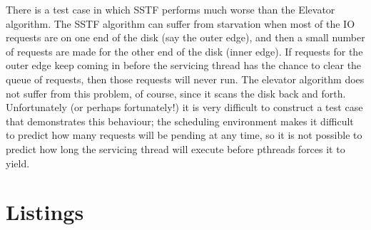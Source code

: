 \documentclass{report}
\begin{document}
There is a test case in which SSTF performs much worse than the Elevator algorithm. The
SSTF algorithm can suffer from starvation when most of the IO requests are on one end of
the disk (say the outer edge), and then a small number of requests are made for the other
end of the disk (inner edge). If
requests for the outer edge keep coming in before the servicing thread has the chance to
clear the queue of requests, then those requests will never run. The elevator algorithm
does not suffer from this problem, of course, since it scans the disk back and forth.
Unfortunately (or perhaps fortunately!) it is very difficult to construct a test case that demonstrates this
behaviour; the scheduling environment makes it difficult to predict how many
requests will be pending at any time, so it is not possible to predict how long the servicing
thread will execute before pthreads forces it to yield.

\section{Listings} %


\tableofcontents %
\end{document}
